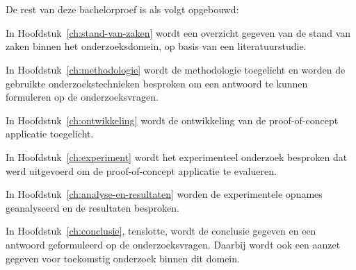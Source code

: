 \section{}%
\label{sec:opzet-bachelorproef}


De rest van deze bachelorproef is als volgt opgebouwd:

In Hoofdstuk~\ref{ch:stand-van-zaken} wordt een overzicht gegeven van de stand van zaken binnen het onderzoeksdomein, op basis van een literatuurstudie.

In Hoofdstuk~\ref{ch:methodologie} wordt de methodologie toegelicht en worden de gebruikte onderzoekstechnieken besproken om een antwoord te kunnen formuleren op de onderzoeksvragen.

In Hoofdstuk~\ref{ch:ontwikkeling} wordt de ontwikkeling van de proof-of-concept applicatie toegelicht.

In Hoofdstuk~\ref{ch:experiment} wordt het experimenteel onderzoek besproken dat werd uitgevoerd om de proof-of-concept applicatie te evalueren.

In Hoofdstuk~\ref{ch:analyse-en-resultaten} worden de experimentele opnames geanalyseerd en de resultaten besproken.

In Hoofdstuk~\ref{ch:conclusie}, tenslotte, wordt de conclusie gegeven en een antwoord geformuleerd op de onderzoeksvragen. Daarbij wordt ook een aanzet gegeven voor toekomstig onderzoek binnen dit domein.